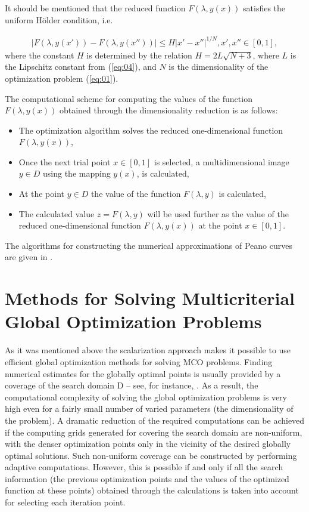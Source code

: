 \documentclass[smallcondensed]{svjour3}     %
\begin{document}
It should be mentioned that the reduced function $F(\lambda, y(x))$ satisfies the uniform H\"{o}lder condition, i.e.

\begin{eqnarray} \label{eq:07}
|F(\lambda,y(x')) - F(\lambda,y(x''))| \leq H |x' - x''|^{1/N}, x', x'' \in [0,1], 
\end{eqnarray}
where the constant $H$ is determined by the relation $H = 2L \sqrt{N+3}$, where $L$ is the Lipschitz constant from (\ref{eq:04}), and $N$ is the dimensionality of the optimization problem (\ref{eq:01}). \par

The computational scheme for computing the values of the function $F(\lambda, y(x))$ obtained through the dimensionality reduction is as follows:
\begin{itemize}
	\item The optimization algorithm solves the reduced one-dimensional function $F(\lambda, y(x))$,
	\item Once the next trial point $x \in [0,1]$ is selected, a multidimensional image $y \in D$ using the mapping $y(x)$, is calculated,
	\item At the point $y \in D$ the value of the function $F(\lambda, y)$ is calculated,
	\item The calculated value $z = F(\lambda, y)$ will be used further as the value of the reduced one-dimensional function $F(\lambda, y(x))$ at the point $x \in [0,1]$.
\end{itemize}
	
The algorithms for constructing the numerical approximations of Peano curves are given in \cite{c38}.

\section{Methods for Solving Multicriterial Global Optimization Problems}  \label{sec:3}
As it was mentioned above the scalarization approach makes it possible to use efficient global optimization methods for solving MCO problems. Finding numerical estimates for the globally optimal points is usually provided by a coverage of the search domain D -- see, for instance, \cite{c12,c22,c24,c25,c27,c31,c35,c37,c38,c39,c41,c44,c51,c52}. As a result, the computational complexity of solving the global optimization problems is very high even for a fairly small number of varied parameters (the dimensionality of the problem). A dramatic reduction of the required computations can be achieved if the computing grids generated for covering the search domain are non-uniform, with the denser optimization points only in the vicinity of the desired globally optimal solutions. Such non-uniform coverage can be constructed by performing adaptive computations. However, this is possible if and only if all the search information (the previous optimization points and the values of the optimized function at these points) obtained through the calculations is taken into account for selecting each iteration point.
\end{document}
